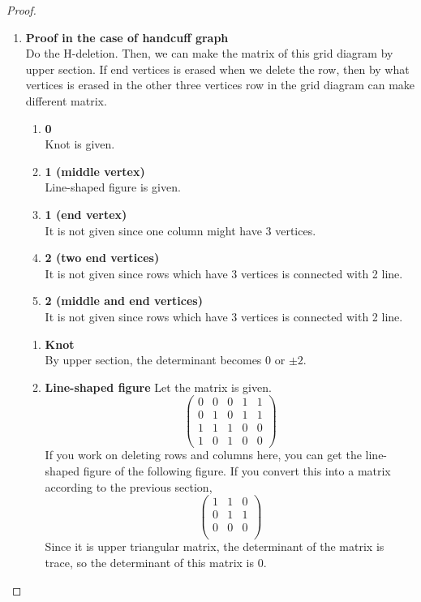 \documentclass{article}
\theoremstyle{definition}
\begin{document}
\begin{proof}
\begin{enumerate}
\item \textbf{Proof in the case of handcuff graph}\\
    Do the H-deletion. Then, we can make the matrix of this grid diagram by upper section. If end vertices is erased when we delete the row, then by what vertices is erased in the other three vertices row in the grid diagram can make different matrix.
    \begin{enumerate}
        \item \textbf{0}\\
        Knot is given.
        \item \textbf{1 (middle vertex)}\\
        Line-shaped figure is given.
        \item \textbf{1 (end vertex)}\\
        It is not given since one column might have 3 vertices.
        \item \textbf{2 (two end vertices)}\\
        It is not given since rows which have 3 vertices is connected with 2 line.
        \item \textbf{2 (middle and end vertices)}\\
        It is not given since rows which have 3 vertices is connected with 2 line.
    \end{enumerate}
    
    \begin{enumerate}[label={(\roman*)}]
        \item \textbf{Knot}\\
        By upper section, the determinant becomes 0 or $\pm 2$.
        \item \textbf{Line-shaped figure}
        Let the matrix is given.
        $$\begin{pmatrix}
            0 & 0 & 0 & 1 & 1\\
            0 & 1 & 0 & 1 & 1\\
            1 & 1 & 1 & 0 & 0\\
            1 & 0 & 1 & 0 & 0
        \end{pmatrix}$$
        If you work on deleting rows and columns here, you can get the line-shaped figure of the following figure. If you convert this into a matrix according to the previous section,
        $$\begin{pmatrix}
            1 & 1 & 0 \\
            0 & 1 & 1 \\
            0 & 0 & 0 \\
        \end{pmatrix}$$
        Since it is upper triangular matrix, the determinant of the matrix is trace, so the determinant of this matrix is 0.
    \end{enumerate}
\end{enumerate}
\end{proof}
\end{document}
